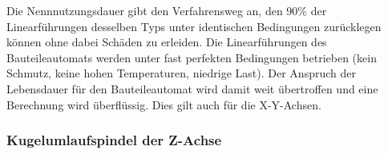 \documentclass{scrartcl}
\begin{document}
\begin{itemize}
Die Nennnutzungsdauer gibt den Verfahrensweg an, den $90\%$ der Linearführungen desselben Typs unter identischen 
Bedingungen zurücklegen können ohne dabei Schäden zu erleiden. Die Linearführungen des Bauteileautomats werden unter 
fast perfekten Bedingungen betrieben (kein Schmutz, keine hohen Temperaturen, niedrige Last). Der Anspruch der Lebensdauer für den Bauteileautomat wird damit weit übertroffen und eine Berechnung wird überflüssig. Dies gilt auch für die X-Y-Achsen.
\newline




		


		
		


\end {itemize}






\subsubsection{Kugelumlaufspindel der Z-Achse}
\end{document}

